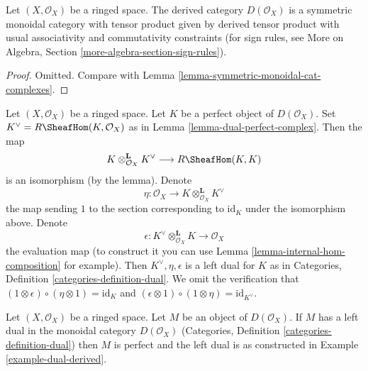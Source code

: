 \begin{lemma}
\label{lemma-symmetric-monoidal-derived}
Let $(X, \mathcal{O}_X)$ be a ringed space. The derived category
$D(\mathcal{O}_X)$ is a symmetric monoidal category with tensor product
given by derived tensor product with usual associativity and
commutativity constraints (for sign rules, see
More on Algebra, Section \ref{more-algebra-section-sign-rules}).
\end{lemma}

\begin{proof}
Omitted. Compare with Lemma \ref{lemma-symmetric-monoidal-cat-complexes}.
\end{proof}

\begin{example}
\label{example-dual-derived}
Let $(X, \mathcal{O}_X)$ be a ringed space. Let $K$ be a perfect object
of $D(\mathcal{O}_X)$. Set $K^\vee = R\SheafHom(K, \mathcal{O}_X)$
as in Lemma \ref{lemma-dual-perfect-complex}.
Then the map
$$
K \otimes_{\mathcal{O}_X}^\mathbf{L} K^\vee \longrightarrow R\SheafHom(K, K)
$$
is an isomorphism (by the lemma). Denote
$$
\eta :
\mathcal{O}_X
\longrightarrow
K \otimes_{\mathcal{O}_X}^\mathbf{L} K^\vee
$$
the map sending $1$ to the section corresponding to
$\text{id}_K$ under the isomorphism above.
Denote
$$
\epsilon :
K^\vee
\otimes_{\mathcal{O}_X}^\mathbf{L} K
\longrightarrow
\mathcal{O}_X
$$
the evaluation map (to construct it you can use
Lemma \ref{lemma-internal-hom-composition} for example). Then
$K^\vee, \eta, \epsilon$ is a left dual for $K$ as in
Categories, Definition \ref{categories-definition-dual}.
We omit the verification that
$(1 \otimes \epsilon) \circ (\eta \otimes 1) = \text{id}_K$
and
$(\epsilon \otimes 1) \circ (1 \otimes \eta) =
\text{id}_{K^\vee}$.
\end{example}

\begin{lemma}
\label{lemma-left-dual-derived}
Let $(X, \mathcal{O}_X)$ be a ringed space. Let $M$ be an object
of $D(\mathcal{O}_X)$. If $M$ has a left dual in the monoidal category
$D(\mathcal{O}_X)$ (Categories, Definition \ref{categories-definition-dual})
then $M$ is perfect and the left dual is as constructed in
Example \ref{example-dual-derived}.
\end{lemma}

